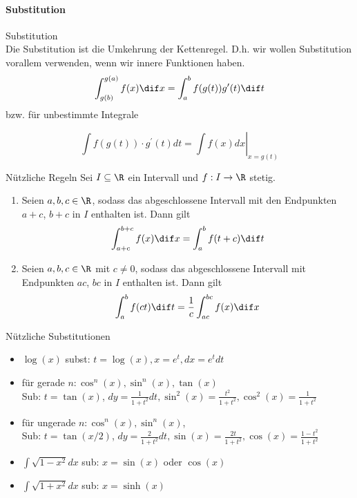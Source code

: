 \paragraph*{Substitution}

\begin{concept}{Substitution}\\
    Die Substitution ist die Umkehrung der Kettenregel. D.h. wir wollen Substitution vorallem verwenden, wenn wir innere Funktionen haben.
    \begin{equation*}
        \int_{g(b)}^{g(a)} f(x) \dif x = \int_{a}^b f(g(t)) g'(t) \dif t
    \end{equation*}
    bzw. für unbestimmte Integrale

    $$
    \int f(g(t)) \cdot g^{\prime}(t) d t=\left.\int f(x) d x\right|_{x=g(t)}
    $$
\end{concept}




\begin{corollary}{Nützliche Regeln}
	Sei $I \subseteq \R$ ein Intervall und $f: I \to \R$ stetig.
	\begin{enumerate}
		\item Seien $a,b,c \in \R$, sodass das abgeschlossene Intervall mit den Endpunkten $a+c$, $b+c$ in $I$ enthalten ist.
			Dann gilt
			\begin{equation*}
				\int_{a+c}^{b+c} f(x) \dif x = \int_{a}^{b} f(t+c) \dif t
			\end{equation*}
		\item Seien $a,b,c \in \R$ mit $c \neq 0$, sodass das abgeschlossene Intervall mit Endpunkten $ac$, $bc$ in $I$ enthalten ist.
			Dann gilt
			\begin{equation*}
				\int_{a}^{b} f(ct) \dif t = \frac{1}{c} \int_{ac}^{bc} f(x) \dif x
			\end{equation*}
	\end{enumerate}
\end{corollary}

\begin{KR}{Nützliche Substitutionen}
    \begin{itemize}
        \item $\log (x)$ subst: $t=\log (x), x=e^{t}, d x=e^{t} d t$
        \item für gerade $n: \cos ^{n}(x), \sin ^{n}(x), \tan (x)$ \\Sub: $t=\tan (x)$, $d y=\frac{1}{1+t^{2}} d t, \sin ^{2}(x)=\frac{t^{2}}{1+t^{2}}, \cos ^{2}(x)=\frac{1}{1+t^{2}}$
        \item für ungerade $n: \cos ^{n}(x), \sin ^{n}(x)$, \\Sub: $t=\tan (x / 2)$, $d y=\frac{2}{1+t^{2}} d t, \sin (x)=\frac{2 t}{1+t^{2}}, \cos (x)=\frac{1-t^{2}}{1+t^{2}}$
        \item $\int \sqrt{1-x^{2}} d x$ sub: $x=\sin (x)$ oder $\cos (x)$
        \item $\int \sqrt{1+x^{2}} d x$ sub: $x=\sinh (x)$
    \end{itemize}
\end{KR}





